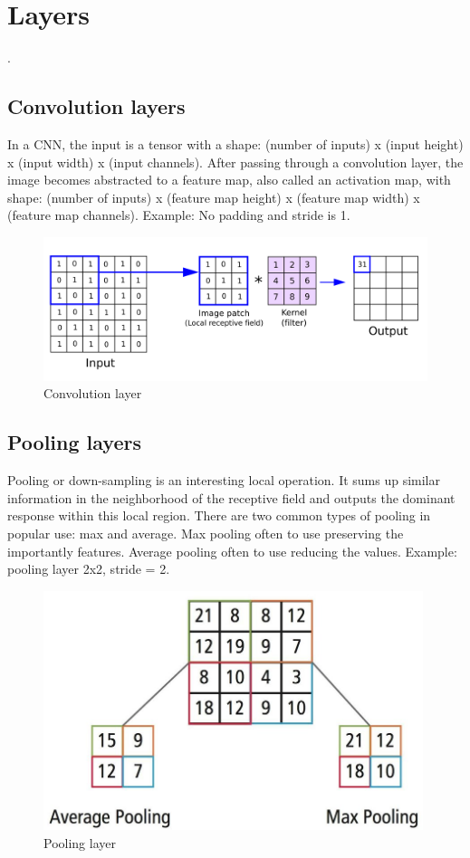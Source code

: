 \documentclass[12pt]{report}
\begin{document}
	\section{Layers}.
	\subsection{Convolution layers}
	In a CNN, the input is a tensor with a shape: (number of inputs) x (input height) x (input width) x (input channels). After passing through a convolution layer, the image becomes abstracted to a feature map, also called an activation map, with shape: (number of inputs) x (feature map height) x (feature map width) x (feature map channels). Example: No padding and stride is 1.
	
	\begin{figure}[ht]
		\includegraphics[width=\textwidth]{conv.png}\caption{Convolution layer}\label{fig:conv}
	\end{figure}
	\subsection{Pooling layers}
	Pooling or down-sampling is an interesting local operation. It sums up similar information in the neighborhood of the receptive field and outputs the dominant response within this local region. There are two common types of pooling in popular use: max and average. Max pooling often to use preserving the importantly features. Average pooling often to use reducing the values. 
	Example: pooling layer 2x2, stride = 2.
	\begin{figure}[h]
		\includegraphics[width=\textwidth,height=7cm]{pooling.png}\caption{Pooling layer}\label{fig:pooling}
	\end{figure}
	
\end{document}
